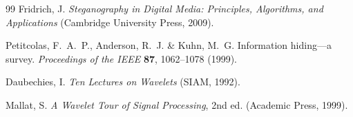 \begin{thebibliography}{99}
Fridrich, J.
\emph{Steganography in Digital Media: Principles, Algorithms, and Applications} (Cambridge University Press, 2009).

Petitcolas, F.~A.~P., Anderson, R.~J. \& Kuhn, M.~G.
Information hiding---a survey.
\emph{Proceedings of the IEEE} \textbf{87}, 1062--1078 (1999).

Daubechies, I.
\emph{Ten Lectures on Wavelets} (SIAM, 1992).

Mallat, S.
\emph{A Wavelet Tour of Signal Processing}, 2nd ed. (Academic Press, 1999).

\end{thebibliography}
